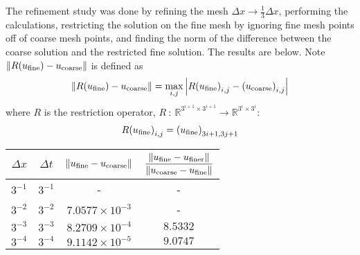 \documentclass{article} %
\theoremstyle{plain}
\newcommand{\Dx}{\Delta x}
\newcommand{\Dt}{\Delta t}
\numberwithin{equation}{section} %
\numberwithin{figure}{section} %
\numberwithin{table}{section} %
\begin{document}
\begin{enumerate}[\ \ (a)]
\begin{figure}[ht!]
        \end{figure}
        \FloatBarrier
        The refinement study was done by refining the mesh $\Dx \rightarrow \frac{1}{3}\Dx$, performing the calculations, restricting the solution on the fine mesh by ignoring fine mesh points off of coarse mesh points, and finding the norm of the difference between the coarse solution and the restricted fine solution.  The results are below.  Note $\norm{R\qty(u_\text{fine}) - u_\text{coarse}}$ is defined as
        \begin{align*}
            \norm{R\qty(u_\text{fine}) - u_\text{coarse}} = \max_{i,j}\abs{R\qty(u_\text{fine})_{i,j} - \qty(u_\text{coarse})_{i,j}}
        \end{align*}
        where $R$ is the restriction operator, $R\ :\ \mathbb{R}^{3^{i+1}\times3^{i+1}} \rightarrow \mathbb{R}^{3^i\times3^i}$:
        \begin{align*}
            R\qty(u_\text{fine})_{i,j} = \qty(u_\text{fine})_{3i+1,3j+1}
        \end{align*}
        \begin{table}[ht!]
            \centering
            \begin{tabular}{||c|c|c|c||}\hline\hline
            $\Dx$ & $\Dt$ & $\norm{u_\text{fine} - u_\text{coarse}}$ & $\dfrac{\norm{u_\text{fine} - u_\text{finer}}}{\norm{u_\text{coarse} - u_\text{fine}}}$\\\hline\hline
            $3^{-1}$ & $3^{-1}$ & - & - \\\hline
            $3^{-2}$ & $3^{-2}$ & $7.0577\times10^{-3}$ & -\\\hline
            $3^{-3}$ & $3^{-3}$ & $8.2709\times10^{-4}$ & $8.5332$ \\\hline
            $3^{-4}$ & $3^{-4}$ & $9.1142\times10^{-5}$ & $9.0747$ \\\hline

\end{tabular}
\end{table}
\end{enumerate}
\end{document}
